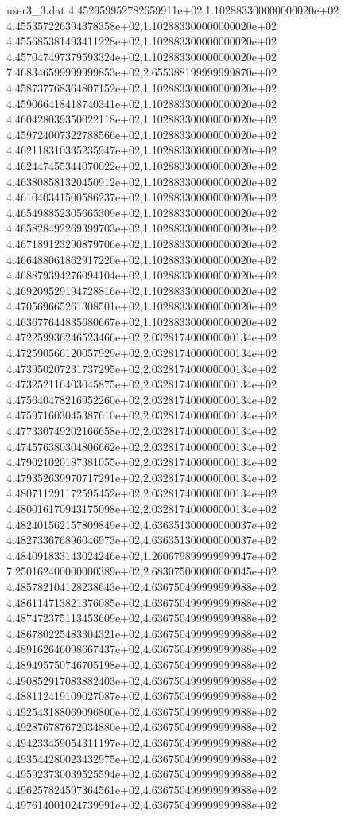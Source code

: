 \begin{filecontents}{user3_3.dat}
4.452959952782659911e+02,1.102883300000000020e+02
4.455357226394378358e+02,1.102883300000000020e+02
4.455685381493411228e+02,1.102883300000000020e+02
4.457047497379593324e+02,1.102883300000000020e+02
7.468346599999999853e+02,2.655388199999999870e+02
4.458737768364807152e+02,1.102883300000000020e+02
4.459066418418740341e+02,1.102883300000000020e+02
4.460428039350022118e+02,1.102883300000000020e+02
4.459724007322788566e+02,1.102883300000000020e+02
4.462118310335235947e+02,1.102883300000000020e+02
4.462447455344070022e+02,1.102883300000000020e+02
4.463808581320450912e+02,1.102883300000000020e+02
4.461040341500586237e+02,1.102883300000000020e+02
4.465498852305665309e+02,1.102883300000000020e+02
4.465828492269399703e+02,1.102883300000000020e+02
4.467189123290879706e+02,1.102883300000000020e+02
4.466488061862917220e+02,1.102883300000000020e+02
4.468879394276094104e+02,1.102883300000000020e+02
4.469209529194728816e+02,1.102883300000000020e+02
4.470569665261308501e+02,1.102883300000000020e+02
4.463677644835680667e+02,1.102883300000000020e+02
4.472259936246523466e+02,2.032817400000000134e+02
4.472590566120057929e+02,2.032817400000000134e+02
4.473950207231737295e+02,2.032817400000000134e+02
4.473252116403045875e+02,2.032817400000000134e+02
4.475640478216952260e+02,2.032817400000000134e+02
4.475971603045387610e+02,2.032817400000000134e+02
4.477330749202166658e+02,2.032817400000000134e+02
4.474576380304806662e+02,2.032817400000000134e+02
4.479021020187381055e+02,2.032817400000000134e+02
4.479352639970717291e+02,2.032817400000000134e+02
4.480711291172595452e+02,2.032817400000000134e+02
4.480016170943175098e+02,2.032817400000000134e+02
4.482401562157809849e+02,4.636351300000000037e+02
4.482733676896046973e+02,4.636351300000000037e+02
4.484091833143024246e+02,1.260679899999999947e+02
7.250162400000000389e+02,2.683075000000000045e+02
4.485782104128238643e+02,4.636750499999999988e+02
4.486114713821376085e+02,4.636750499999999988e+02
4.487472375113453609e+02,4.636750499999999988e+02
4.486780225483304321e+02,4.636750499999999988e+02
4.489162646098667437e+02,4.636750499999999988e+02
4.489495750746705198e+02,4.636750499999999988e+02
4.490852917083882403e+02,4.636750499999999988e+02
4.488112419109027087e+02,4.636750499999999988e+02
4.492543188069096800e+02,4.636750499999999988e+02
4.492876787672034880e+02,4.636750499999999988e+02
4.494233459054311197e+02,4.636750499999999988e+02
4.493544280023432975e+02,4.636750499999999988e+02
4.495923730039525594e+02,4.636750499999999988e+02
4.496257824597364561e+02,4.636750499999999988e+02
4.497614001024739991e+02,4.636750499999999988e+02

\end{filecontents}
